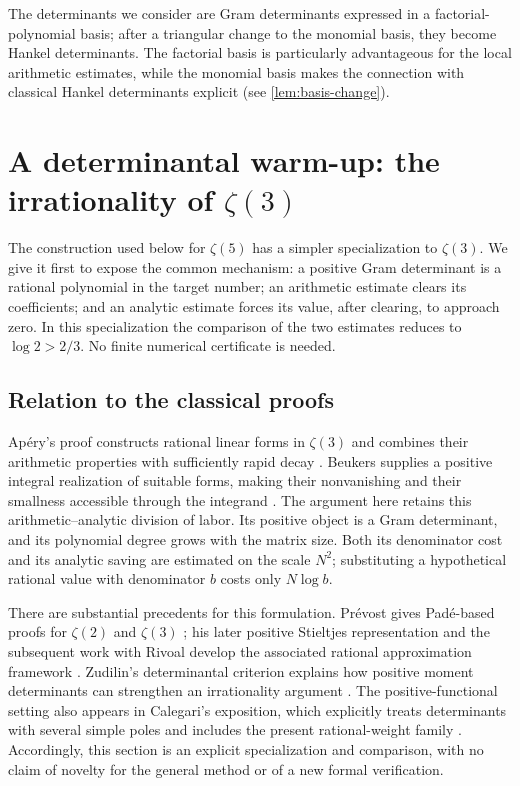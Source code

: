 \documentclass[11pt,letterpaper]{article}
\theoremstyle{definition}
\begin{document}
The determinants we consider are Gram determinants expressed
in a factorial-polynomial basis; after a triangular change to the
monomial basis, they become Hankel determinants. The factorial basis
is particularly advantageous for the local arithmetic estimates,
while the monomial basis makes the connection with classical Hankel
determinants explicit (see \cref{lem:basis-change}).


\section{A determinantal warm-up: the irrationality of \texorpdfstring{$\zeta(3)$}{zeta(3)}}
\label{sec:zeta3-warmup}

The construction used below for $\zeta(5)$ has a simpler specialization to
$\zeta(3)$. We give it first to expose the common mechanism: a positive
Gram determinant is a rational polynomial in the target number; an
arithmetic estimate clears its coefficients; and an analytic estimate
forces its value, after clearing, to approach zero. In this specialization
the comparison of the two estimates reduces to $\log2>2/3$. No finite
numerical certificate is needed.

\subsection{Relation to the classical proofs}

Ap\'ery's proof constructs rational linear forms in $\zeta(3)$ and combines
their arithmetic properties with sufficiently rapid decay
\cite{apery1979}. Beukers supplies a positive integral realization of
suitable forms, making their nonvanishing and their smallness accessible
through the integrand \cite{beukers1979}. The argument here retains this
arithmetic--analytic division of labor. Its positive object is a Gram
determinant, and its polynomial degree grows with the matrix size. Both
its denominator cost and its analytic saving are estimated on the scale
$N^2$; substituting a hypothetical rational value with denominator $b$
costs only $N\log b$.

There are substantial precedents for this formulation. Pr\'evost gives
Pad\'e-based proofs for $\zeta(2)$ and $\zeta(3)$
\cite{prevost1996}; his later positive Stieltjes representation and the
subsequent work with Rivoal develop the associated rational approximation
framework \cite{prevost2019,prevostrivoal2021}. Zudilin's determinantal
criterion explains how positive moment determinants can strengthen an
irrationality argument \cite{zudilin2017}. The positive-functional setting
also appears in Calegari's exposition, which explicitly treats determinants
with several simple poles and includes the present rational-weight family
\cite{calegari2026}. Accordingly,
this section is an explicit specialization and comparison, with no claim
of novelty for the general method or of a new formal verification.
\end{document}

